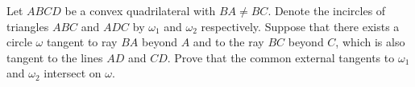 Let $ ABCD$ be a convex quadrilateral with $ BA\neq BC$. Denote the incircles of triangles $ ABC$ and $ ADC$ by $ \omega_{1}$ and $ \omega_{2}$ respectively. Suppose that there exists a circle $ \omega$ tangent to ray $ BA$ beyond $ A$ and to the ray $ BC$ beyond $ C$,  which is also tangent to the lines $ AD$ and $ CD$. Prove that the common external tangents to $ \omega_{1}$ and $\omega_{2}$ intersect on $ \omega$.
